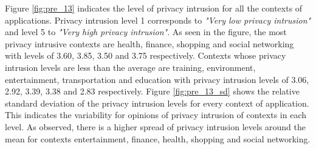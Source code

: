 Figure \ref{fig:pre_13} indicates the level of privacy intrusion for all the contexts of applications.  Privacy intrusion level 1 corresponds to \textit{"Very low privacy intrusion"} and level 5 to \textit{"Very high privacy intrusion"}. As seen in the figure, the most privacy intrusive contexts are health, finance, shopping and social networking with levels of 3.60, 3.85, 3.50 and 3.75 respectively. Contexts whose privacy intrusion levels are less than the average are training, environment, entertainment, transportation and education with privacy intrusion levels of 3.06, 2.92, 3.39, 3.38 and 2.83 respectively. Figure \ref{fig:pre_13_sd} shows the relative standard deviation of the privacy intrusion levels for every context of application.  This indicates the variability for opinions of privacy intrusion of contexts in each level. As observed, there is a higher spread of privacy intrusion levels around the mean for contexts entertainment, finance, health, shopping and social networking.
%
%
%
%
%
%
%
